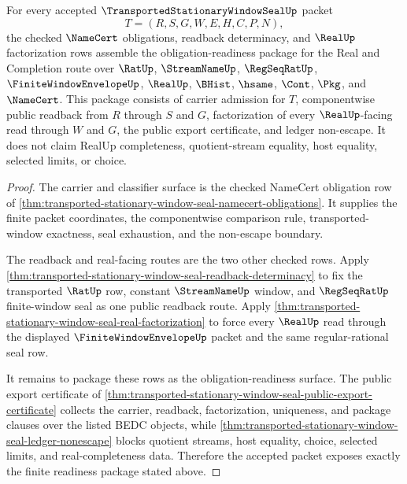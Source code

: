 \begin{theorem}
\label{thm:transported-stationary-window-seal-obligation-readiness}
For every accepted $\TransportedStationaryWindowSealUp$ packet
$$
T=(R,S,G,W,E,H,C,P,N),
$$
the checked $\NameCert$ obligations, readback determinacy, and $\RealUp$ factorization rows assemble the obligation-readiness package for the Real and Completion route over $\RatUp$, $\StreamNameUp$, $\RegSeqRatUp$, $\FiniteWindowEnvelopeUp$, $\RealUp$, $\BHist$, $\hsame$, $\Cont$, $\Pkg$, and $\NameCert$. This package consists of carrier admission for $T$, componentwise public readback from $R$ through $S$ and $G$, factorization of every $\RealUp$-facing read through $W$ and $G$, the public export certificate, and ledger non-escape. It does not claim RealUp completeness, quotient-stream equality, host equality, selected limits, or choice.
\end{theorem}
\begin{proof}
The carrier and classifier surface is the checked NameCert obligation row of \autoref{thm:transported-stationary-window-seal-namecert-obligations}. It supplies the finite packet coordinates, the componentwise comparison rule, transported-window exactness, seal exhaustion, and the non-escape boundary.

The readback and real-facing routes are the two other checked rows. Apply \autoref{thm:transported-stationary-window-seal-readback-determinacy} to fix the transported $\RatUp$ row, constant $\StreamNameUp$ window, and $\RegSeqRatUp$ finite-window seal as one public readback route. Apply \autoref{thm:transported-stationary-window-seal-real-factorization} to force every $\RealUp$ read through the displayed $\FiniteWindowEnvelopeUp$ packet and the same regular-rational seal row.

It remains to package these rows as the obligation-readiness surface. The public export certificate of \autoref{thm:transported-stationary-window-seal-public-export-certificate} collects the carrier, readback, factorization, uniqueness, and package clauses over the listed BEDC objects, while \autoref{thm:transported-stationary-window-seal-ledger-nonescape} blocks quotient streams, host equality, choice, selected limits, and real-completeness data. Therefore the accepted packet exposes exactly the finite readiness package stated above.
\end{proof}

